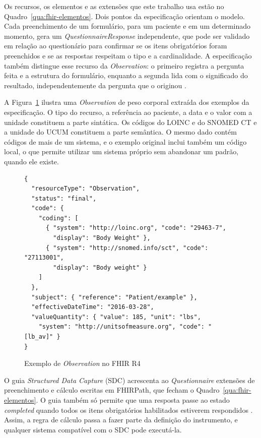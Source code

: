 Os recursos, os elementos e as extensões que este trabalho usa estão no Quadro~\ref{qua:fhir-elementos}. Dois
pontos da especificação orientam o modelo. Cada preenchimento de um formulário, para um paciente e em um
determinado momento, gera um \textit{QuestionnaireResponse} independente, que pode ser validado em relação ao
questionário para confirmar se os itens obrigatórios foram preenchidos e se as respostas respeitam o tipo e a
cardinalidade. A especificação também distingue esse recurso da \textit{Observation}: o primeiro registra a
pergunta feita e a estrutura do formulário, enquanto a segunda lida com o significado do resultado,
independentemente da pergunta que o originou \cite{hl7fhirR4}.

A Figura~\ref{fig:ref-fhir-exemplo} ilustra uma \textit{Observation} de peso corporal extraída dos exemplos da
especificação. O tipo do recurso, a referência ao paciente, a data e o valor com a unidade constituem a parte
sintática. Os códigos do LOINC e do SNOMED CT e a unidade do UCUM constituem a parte semântica. O mesmo dado contém
códigos de mais de um sistema, e o exemplo original inclui também um código local, o que permite utilizar um sistema
próprio sem abandonar um padrão, quando ele existe.

\begin{figure}[htb]
	\centering
	\caption{Exemplo de \textit{Observation} no FHIR R4}
	\label{fig:ref-fhir-exemplo}
	\begin{minipage}{0.82\textwidth}
	\footnotesize
\begin{verbatim}
{
  "resourceType": "Observation",
  "status": "final",
  "code": {
    "coding": [
      { "system": "http://loinc.org", "code": "29463-7",
        "display": "Body Weight" },
      { "system": "http://snomed.info/sct", "code": "27113001",
        "display": "Body weight" }
    ]
  },
  "subject": { "reference": "Patient/example" },
  "effectiveDateTime": "2016-03-28",
  "valueQuantity": { "value": 185, "unit": "lbs",
    "system": "http://unitsofmeasure.org", "code": "[lb_av]" }
}
\end{verbatim}
	\end{minipage}
\end{figure}

O guia \textit{Structured Data Capture} (SDC) acrescenta ao \textit{Questionnaire} extensões de preenchimento e
cálculo escritas em FHIRPath, que fecham o Quadro~\ref{qua:fhir-elementos}. O guia também só permite que uma
resposta passe ao estado \textit{completed} quando todos os itens obrigatórios habilitados estiverem respondidos
\cite{hl7sdc}. Assim, a regra de cálculo passa a fazer parte da definição do instrumento, e qualquer sistema
compatível com o SDC pode executá-la.

